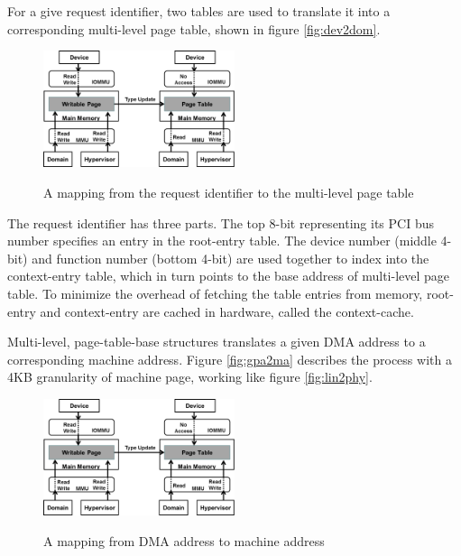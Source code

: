 For a give request identifier, two tables are used to translate it into a corresponding multi-level page table, shown in figure \ref{fig:dev2dom}.

\begin{figure}[ht]
\centering
\includegraphics[width=0.5\textwidth]{image/translation/dev2dom.png} \\
\caption{A mapping from the request identifier to the multi-level page table}
\label{fig: dev2dom}
\end{figure}

The request identifier has three parts. The top 8-bit representing its PCI bus number specifies an entry in the root-entry table. The device number (middle 4-bit) and function number (bottom 4-bit) are used together to index into the context-entry table, which in turn points to the base address of multi-level page table. To minimize the overhead of fetching the table entries from memory, root-entry and context-entry are cached in hardware, called the context-cache.

Multi-level, page-table-base structures translates a given DMA address to a corresponding machine address. Figure \ref{fig:gpa2ma} describes the process with a 4KB granularity of machine page, working like figure \ref{fig:lin2phy}.

\begin{figure}[ht]
\centering
\includegraphics[width=0.5\textwidth]{image/translation/gpa2ma.png} \\
\caption{A mapping from DMA address to machine address}
\label{fig: gpa2ma}
\end{figure}

